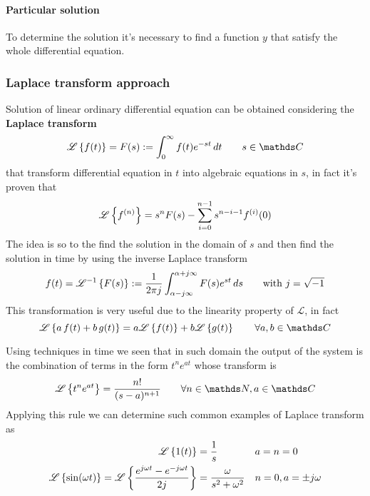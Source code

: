 		\paragraph{Particular solution} To determine the solution it's necessary to find a function $y$ that satisfy the whole differential equation.
	
	\subsubsection{Laplace transform approach}
		Solution of linear ordinary differential equation can be obtained considering the \textbf{Laplace transform}
		\[ \laplace{f(t)} = F(s) := \int_0^\infty f(t) e^{-st}\, dt \qquad s\in \mathds C \]
		that transform differential equation in $t$ into algebraic equations in $s$, in fact it's proven that
		\[ \mathscr L \left\{  f^{(n)} \right\} = s^n F(s) - \sum_{i=0}^{n-1} s^{n-i-1}f^{(i)}(0) \]
		The idea is so to the find the solution in the domain of $s$ and then find the solution in time by using the inverse Laplace transform
		\begin{equation}
			f(t) = \mathscr L^{-1} \left\{ F(s) \right\} : = \frac 1{2\pi j} \int_{\alpha - j\infty}^{\alpha + j\infty} F(s) e^{st}\, ds \qquad \textrm{with } j = \sqrt{-1}
		\end{equation}
		This transformation is very useful due to the linearity property of $\mathscr L$, in fact
		\[ \laplace{a\, f(t) + b \,g(t)} = a \laplace{f(t)} + b \laplace{g(t)} \qquad \forall a,b \in \mathds C \]
		
		Using techniques in time we seen that in such domain the output of the system is the combination of terms in the form $t^n e^{at}$ whose transform is
		\begin{equation} \label{eq:lin:inverseexponential}
			\laplace{t^n e^{at}} = \frac{n!}{(s-a)^{n+1}} \qquad \forall n \in \mathds N,a\in \mathds C
		\end{equation}
		Applying this rule we can determine such common examples of Laplace transform as
		\begin{align*}
			\mathscr L \left\{ 1(t) \right\} & = \frac 1 s && a = n = 0 \\
			\mathscr L \left\{ \sin(\omega t) \right\} = \mathscr L \left\{ \frac{e^{j\omega t} - e^{-j\omega t}}{2j} \right\} & = \frac{\omega}{s^2 + \omega^2}&& n = 0, a = \pm j\omega
		\end{align*}	
		
